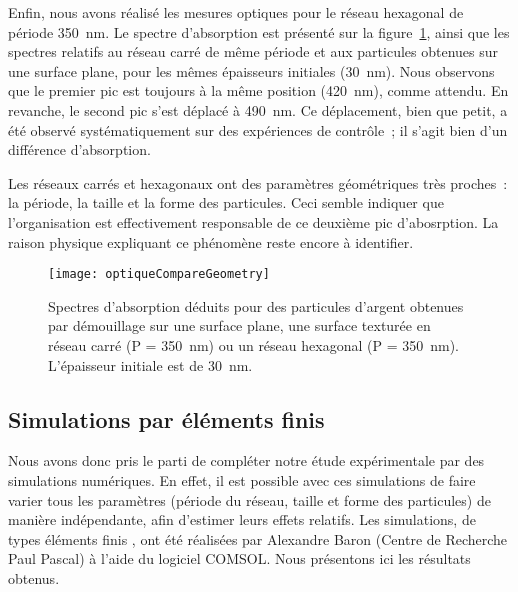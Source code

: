 Enfin, nous avons réalisé les mesures optiques pour le réseau hexagonal de période 350~nm. Le spectre d'absorption est présenté sur la figure~\ref{optiqueCompareGeometry}, ainsi que les spectres relatifs au réseau carré de même période et aux particules obtenues sur une surface plane, pour les mêmes épaisseurs initiales (30~nm). Nous observons que le premier pic est toujours à la même position (420~nm), comme attendu. En revanche, le second pic s'est déplacé à 490~nm. Ce déplacement, bien que petit, a été observé systématiquement sur des expériences de contrôle~; il s'agit bien d'un différence d'absorption.\par 
Les réseaux carrés et hexagonaux ont des paramètres géométriques très proches~: la période, la taille et la forme des particules. Ceci semble indiquer que l'organisation est effectivement responsable de ce deuxième pic d'abosrption. La raison physique expliquant ce phénomène reste encore à identifier.\par 

\begin{figure}[!htb]
\centering
\texttt{[image: optiqueCompareGeometry]}
\caption{Spectres d'absorption déduits pour des particules d'argent obtenues par démouillage sur une surface plane, une surface texturée en réseau carré (P = 350~nm) ou un réseau hexagonal (P = 350~nm). L'épaisseur initiale est de 30~nm.}
\label{optiqueCompareGeometry}
\end{figure}

\subsection{Simulations par éléments finis}
Nous avons donc pris le parti de compléter notre étude expérimentale par des simulations numériques. En effet, il est possible avec ces simulations de faire varier tous les paramètres (période du réseau, taille et forme des particules) de manière indépendante, afin d'estimer leurs effets relatifs. Les simulations, de types \og éléments finis \fg, ont été réalisées par Alexandre Baron (Centre de Recherche Paul Pascal) à l'aide du logiciel COMSOL. Nous présentons ici les résultats obtenus.\par 
